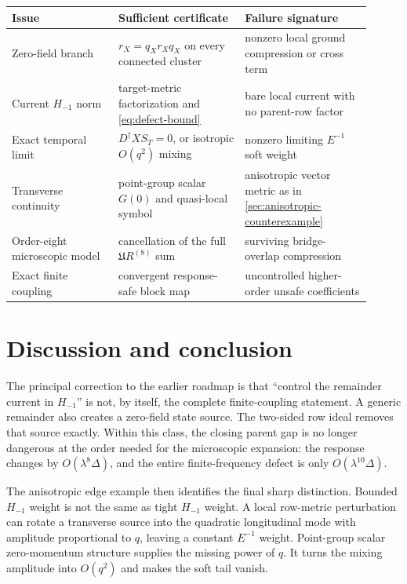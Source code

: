 \documentclass[11pt]{article}
\theoremstyle{definition}
\theoremstyle{remark}
\begin{document}
\begin{center}
\begin{tabular}{@{}p{0.27\linewidth}p{0.32\linewidth}p{0.32\linewidth}@{}}
\toprule
Issue & Sufficient certificate & Failure signature\\
\midrule
Zero-field branch & $r_X=q_Xr_Xq_X$ on every connected cluster & nonzero local ground compression or cross term\\
Current $H_{-1}$ norm & target-metric factorization and \eqref{eq:defect-bound} & bare local current with no parent-row factor\\
Exact temporal limit & $D^\dagger XS_T=0$, or isotropic $O(q^2)$ mixing & nonzero limiting $E^{-1}$ soft weight\\
Transverse continuity & point-group scalar $G(0)$ and quasi-local symbol & anisotropic vector metric as in \cref{sec:anisotropic-counterexample}\\
Order-eight microscopic model & cancellation of the full $\mathfrak U R^{(8)}$ sum & surviving bridge-overlap compression\\
Exact finite coupling & convergent response-safe block map & uncontrolled higher-order unsafe coefficients\\
\bottomrule
\end{tabular}
\end{center}

\section{Discussion and conclusion}

The principal correction to the earlier roadmap is that ``control the
remainder current in $H_{-1}$'' is not, by itself, the complete finite-coupling
statement.  A generic remainder also creates a zero-field state source.  The
two-sided row ideal removes that source exactly.  Within this class, the
closing parent gap is no longer dangerous at the order needed for the
microscopic expansion: the response changes by $O(\lambda^8\Delta)$, and the
entire finite-frequency defect is only $O(\lambda^{10}\Delta)$.

The anisotropic edge example then identifies the final sharp distinction.
Bounded $H_{-1}$ weight is not the same as tight $H_{-1}$ weight.  A local
row-metric perturbation can rotate a transverse source into the quadratic
longitudinal mode with amplitude proportional to $q$, leaving a constant
$E^{-1}$ weight.  Point-group scalar zero-momentum structure supplies the
missing power of $q$.  It turns the mixing amplitude into $O(q^2)$ and makes
the soft tail vanish.
\end{document}
